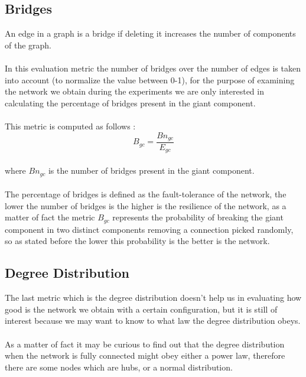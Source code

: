 \documentclass{llncs}
\begin{document}
\subsection{Bridges}
An edge in a graph is a bridge if deleting it increases the number of components of the graph.\\\\
%
In this evaluation metric the number of bridges over the number of edges is taken into account (to normalize the value between 0-1), for the purpose of examining the network we obtain during the experiments we are only interested in calculating the percentage of bridges present in the giant component.\\\\
%
This metric is computed as follows : \\
%
\[ B_{gc} = \frac{Bn_{gc}}{E_{gc}} \]
%
\\
where $Bn_{gc}$ is the number of bridges present in the giant component.\\\\
%
The percentage of bridges is defined as the fault-tolerance of the network, the lower the number of bridges is the higher is the resilience of the network, as a matter of fact the metric $B_{gc}$ represents the probability of breaking the giant component in two distinct components removing a connection picked randomly, so as stated before the lower this probability is the better is the network.
\subsection{Degree Distribution}
The last metric which is the degree distribution doesn't help us in evaluating how good is the network we obtain with a certain configuration, but it is still of interest because we may want to know to what law the degree distribution obeys.\\\\
As a matter of fact it may be curious to find out that the degree distribution when the network is fully connected might obey either a power law, therefore there are some nodes which are hubs, or a normal distribution.
%
\end{document}
